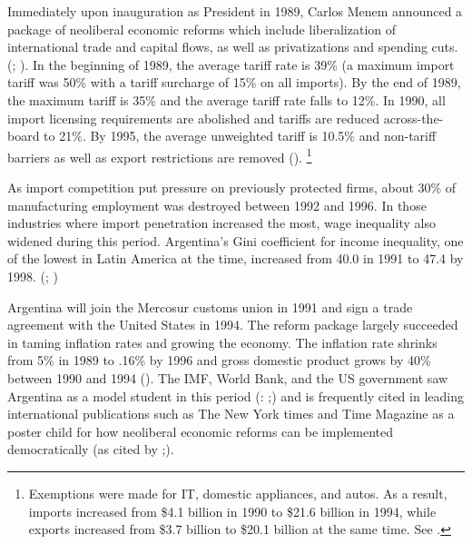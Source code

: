 \documentclass[12pt]{report}
\begin{document}
Immediately upon inauguration as President in 1989, Carlos Menem announced
a package of neoliberal economic reforms which include liberalization
of international trade and capital flows, as well as privatizations
and spending cuts. (\citealt[189]{Tommasi:1995wx}; \citealt{Borner:2002cp}).
In the beginning of 1989, the average tariff rate is 39\% (a maximum
import tariff was 50\% with a tariff surcharge of 15\% on all imports).
By the end of 1989, the maximum tariff is 35\% and the average tariff
rate falls to 12\%. In 1990, all import licensing requirements are
abolished and tariffs are reduced across-the-board to 21\%. By 1995,
the average unweighted tariff is 10.5\% and non-tariff barriers as
well as export restrictions are removed (\citealt[7]{Beker:2011vq}).%
\footnote{Exemptions were made for IT, domestic appliances, and autos. As a
result, imports increased from \$4.1 billion in 1990 to \$21.6 billion
in 1994, while exports increased from \$3.7 billion to \$20.1 billion
at the same time. See \citet{Beker:2011vq}.%
}

As import competition put pressure on previously protected firms,
about 30\% of manufacturing employment was destroyed between 1992
and 1996. In those industries where import penetration increased the
most, wage inequality also widened during this period. Argentina's
Gini coefficient for income inequality, one of the lowest in Latin
America at the time, increased from 40.0 in 1991 to 47.4 by 1998.
(\citealt[505]{Galiani:2003fr}; \citealt[11]{Beker:2011vq})

Argentina will join the Mercosur customs union in 1991 and sign a
trade agreement with the United States in 1994. The reform package
largely succeeded in taming inflation rates and growing the economy.
The inflation rate shrinks from 5\% in 1989 to .16\% by 1996 and gross
domestic product grows by 40\% between 1990 and 1994 (\citealt[4]{Beker:2011vq}).
The IMF, World Bank, and the US government saw Argentina as a model
student in this period (\citealt{Cavallo:2004ta}: \citealt[142]{Cavallo:2004bf};\citealt{Klein:2002vg})
and is frequently cited in leading international publications such
as The New York times and Time Magazine as a poster child for how
neoliberal economic reforms can be implemented democratically (\citealt{Anonymous:VVaTefru}as
cited by \citealt{stokes2001public};\citealt{Silverstein:2002wm}).
\end{document}
